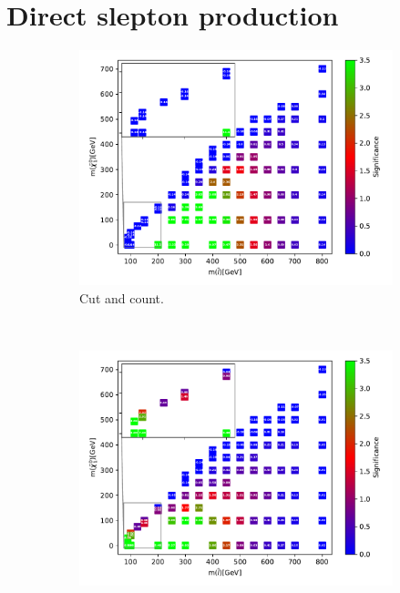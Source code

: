 \label{sec:appsignificance}

\section{Direct slepton production}



\begin{figure}[H]
    \centering
    \begin{subfigure}[t!]{0.49\textwidth}
    \includegraphics[width = \textwidth]{Figures/Significances/significanceCutandCount_slepslep_all.pdf}
    \caption{Cut and count.}
        \label{fig:signLowSlepSlepcandc}
    \end{subfigure}
    \\
    \begin{subfigure}[t!]{0.49\textwidth}
    \includegraphics[width = \textwidth]{Figures/Significances/significance_BDT_slepslep_Low_level.pdf}

\end{subfigure}
\end{figure}
